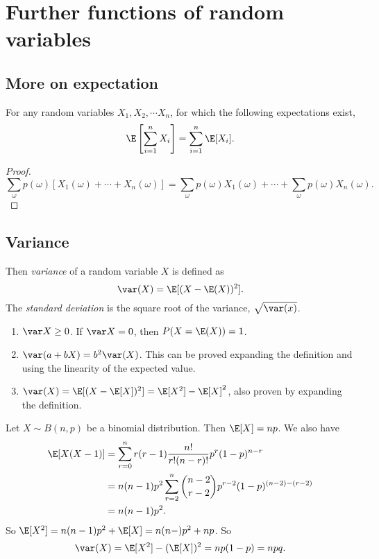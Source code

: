\documentclass[a4paper]{article}
\begin{document}
\section{Further functions of random variables}
\subsection{More on expectation}
\begin{thm}
  For any random variables $X_1, X_2, \cdots X_n$, for which the following expectations exist,
  \[
    \E\left[\sum_{i = 1}^n X_i\right] = \sum_{i = 1}^n \E[X_i].
  \]
\end{thm}

\begin{proof}
  \[
    \sum_\omega p(\omega)[X_1(\omega) + \cdots + X_n(\omega)] = \sum_\omega p(\omega)X_1(\omega) + \cdots + \sum_\omega p(\omega) X_n(\omega).
  \]
\end{proof}

\subsection{Variance}
\begin{defi}
  Then \emph{variance} of a random variable $X$ is defined as
  \[
    \var(X) = \E[(X - \E(X))^2].
  \]
  The \emph{standard deviation} is the square root of the variance, $\sqrt{\var(x)}$.
\end{defi}

\begin{thm}\leavevmode
  \begin{enumerate}
    \item $\var X \geq 0$. If $\var X = 0$, then $P(X = \E(X)) = 1$.
    \item $\var (a + bX) = b^2 \var(X)$. This can be proved expanding the definition and using the linearity of the expected value.
    \item $\var(X) = \E[(X - \E[X])^2] = \E[X^2] - \E[X]^2$, also proven by expanding the definition.
  \end{enumerate}
\end{thm}

\begin{eg}
  Let $X\sim B(n, p)$ be a binomial distribution. Then $\E[X] = np$. We also have
  \begin{align*}
    \E[X(X - 1)] &=  \sum_{r = 0}^n r(r - 1)\frac{n!}{r!(n - r)!} p^r(1 - p)^{n - r}\\
    &= n(n - 1)p^2\sum_{r = 2}^n \binom{n - 2}{r - 2} p^{r - 2}(1 - p)^{(n - 2) - (r - 2)}\\
    &= n(n - 1)p^2.
  \end{align*}
  So $\E[X^2] = n(n - 1)p^2 + \E[X] = n(n - )p^2 + np$. So
  \[
    \var(X) = \E[X^2] - (\E[X])^2  = np(1 - p) = npq.
  \]
\end{eg}
\end{document}

